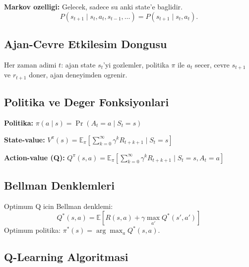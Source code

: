 \documentclass[11pt,a4paper]{article}
\begin{document}
\textbf{Markov ozelligi:} Gelecek, sadece su anki state'e baglidir.
\[
P(s_{t+1} \mid s_t, a_t, s_{t-1}, \ldots) = P(s_{t+1} \mid s_t, a_t).
\]

\subsection{Ajan-Cevre Etkilesim Dongusu}

\begin{center}
\end{center}

Her zaman adimi $t$: ajan state $s_t$'yi gozlemler, politika $\pi$ ile $a_t$ secer, cevre $s_{t+1}$ ve $r_{t+1}$ doner, ajan deneyimden ogrenir.

\subsection{Politika ve Deger Fonksiyonlari}

\textbf{Politika:} $\pi(a \mid s) = \Pr(A_t = a \mid S_t = s)$

\textbf{State-value:} $V^\pi(s) = \mathbb{E}_\pi[\sum_{k=0}^{\infty} \gamma^k R_{t+k+1} \mid S_t = s]$

\textbf{Action-value (Q):} $Q^\pi(s, a) = \mathbb{E}_\pi[\sum_{k=0}^{\infty} \gamma^k R_{t+k+1} \mid S_t = s, A_t = a]$

\subsection{Bellman Denklemleri}

Optimum Q icin Bellman denklemi:
\[
\boxed{\;Q^*(s, a) = \mathbb{E}[R(s,a) + \gamma \max_{a'} Q^*(s', a')]\;}
\]
Optimum politika: $\pi^*(s) = \arg\max_a Q^*(s, a)$.

\subsection{Q-Learning Algoritmasi}
\end{document}
